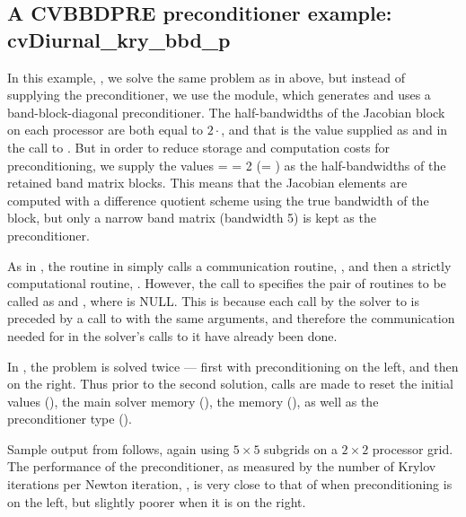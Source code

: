 

\subsection{A CVBBDPRE preconditioner example: cvDiurnal\_kry\_bbd\_p}\label{ss:cvDiurnal_bbd_p}

In this example, , we solve the same
problem as in 
above, but instead of supplying the preconditioner, we use the {\cvbbdpre} module,
which generates and uses a band-block-diagonal preconditioner.  The
half-bandwidths of the Jacobian block on each processor are both equal to
$2\cdot$, and that is the value supplied as  and 
in the call to .  But in order to reduce storage and computation
costs for preconditioning, we supply the values  =  = 2
(= ) as the half-bandwidths of the retained band matrix blocks.
This means that the Jacobian elements are computed with a difference quotient
scheme using the true bandwidth of the block, but only a narrow band matrix
(bandwidth 5) is kept as the preconditioner.

As in , the  routine in  simply calls a
communication routine, , and then a strictly computational routine,
.  However, the call to  specifies the pair of
routines to be called as  and , where  is NULL.
This is because each call by the solver to  is
preceded by a call to  with the same  arguments, and therefore the
communication needed for  in the solver's calls to it have already been
done.

In , the problem is solved twice --- first with preconditioning
on the left, and then on the right.  Thus prior to the second solution, calls
are made to reset the initial values (), the main solver
memory (), the {\cvbbdpre} memory (),
as well as the preconditioner type ().

Sample output from  follows, again using $5 \times 5$ subgrids
on a $2 \times 2$ processor grid.  The performance of the preconditioner,
as measured by the number of Krylov iterations per Newton iteration,
, is very close to that of  when preconditioning is on
the left, but slightly poorer when it is on the right.


